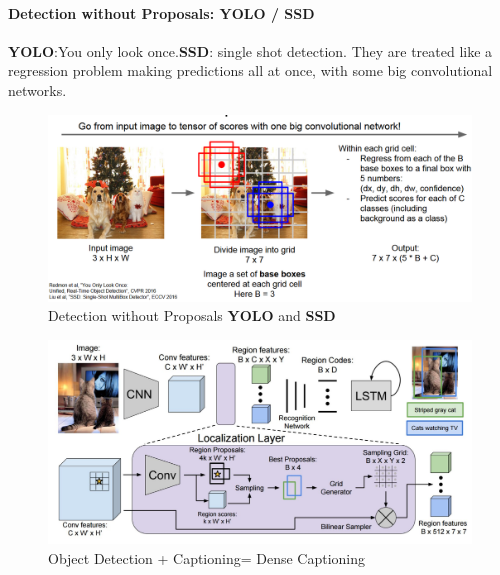 \documentclass[11pt]{article}
\begin{document}
\paragraph{Detection without Proposals: YOLO / SSD}
\textbf{YOLO}:You only look once.\textbf{SSD}: single shot detection. They are treated like a regression problem making predictions all at once, with some big convolutional networks.
\begin{figure}[h]
\centering
\captionsetup{justification=centering}
\includegraphics[width=0.9\linewidth]{L1018.pdf}
\caption{ Detection without Proposals \textbf{YOLO} and \textbf{SSD} }
\label{fig:L1018}
\end{figure}
\begin{figure}[h]
\centering
\captionsetup{justification=centering}
\includegraphics[width=0.9\linewidth]{L1019.pdf}
\caption{ Object Detection + Captioning= Dense Captioning }
\label{fig:L1019}
\end{figure}
\clearpage
\end{document}
